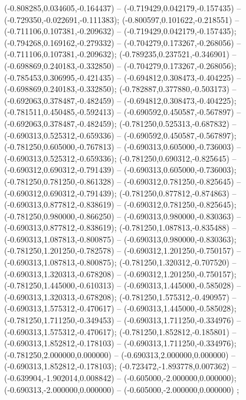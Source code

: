  (-0.808285,0.034605,-0.164437) -- (-0.719429,0.042179,-0.157435) -- (-0.729350,-0.022691,-0.111383);
 (-0.800597,0.101622,-0.218551) -- (-0.711106,0.107381,-0.209632) -- (-0.719429,0.042179,-0.157435);
 (-0.794268,0.169162,-0.279332) -- (-0.704279,0.173267,-0.268056) -- (-0.711106,0.107381,-0.209632);
 (-0.789235,0.237521,-0.346901) -- (-0.698869,0.240183,-0.332850) -- (-0.704279,0.173267,-0.268056);
 (-0.785453,0.306995,-0.421435) -- (-0.694812,0.308473,-0.404225) -- (-0.698869,0.240183,-0.332850);
 (-0.782887,0.377880,-0.503173) -- (-0.692063,0.378487,-0.482459) -- (-0.694812,0.308473,-0.404225);
 (-0.781511,0.450485,-0.592413) -- (-0.690592,0.450587,-0.567897) -- (-0.692063,0.378487,-0.482459);
 (-0.781250,0.525313,-0.687832) -- (-0.690313,0.525312,-0.659336) -- (-0.690592,0.450587,-0.567897);
 (-0.781250,0.605000,-0.767813) -- (-0.690313,0.605000,-0.736003) -- (-0.690313,0.525312,-0.659336);
 (-0.781250,0.690312,-0.825645) -- (-0.690312,0.690312,-0.791439) -- (-0.690313,0.605000,-0.736003);
 (-0.781250,0.781250,-0.861328) -- (-0.690312,0.781250,-0.825645) -- (-0.690312,0.690312,-0.791439);
 (-0.781250,0.877812,-0.874863) -- (-0.690313,0.877812,-0.838619) -- (-0.690312,0.781250,-0.825645);
 (-0.781250,0.980000,-0.866250) -- (-0.690313,0.980000,-0.830363) -- (-0.690313,0.877812,-0.838619);
 (-0.781250,1.087813,-0.835488) -- (-0.690313,1.087813,-0.800875) -- (-0.690313,0.980000,-0.830363);
 (-0.781250,1.201250,-0.782578) -- (-0.690312,1.201250,-0.750157) -- (-0.690313,1.087813,-0.800875);
 (-0.781250,1.320312,-0.707520) -- (-0.690313,1.320313,-0.678208) -- (-0.690312,1.201250,-0.750157);
 (-0.781250,1.445000,-0.610313) -- (-0.690313,1.445000,-0.585028) -- (-0.690313,1.320313,-0.678208);
 (-0.781250,1.575312,-0.490957) -- (-0.690313,1.575312,-0.470617) -- (-0.690313,1.445000,-0.585028);
 (-0.781250,1.711250,-0.349453) -- (-0.690313,1.711250,-0.334976) -- (-0.690313,1.575312,-0.470617);
 (-0.781250,1.852812,-0.185801) -- (-0.690313,1.852812,-0.178103) -- (-0.690313,1.711250,-0.334976);
 (-0.781250,2.000000,0.000000) -- (-0.690313,2.000000,0.000000) -- (-0.690313,1.852812,-0.178103);
 (-0.723472,-1.893778,0.007362) -- (-0.639904,-1.902014,0.008842) -- (-0.605000,-2.000000,0.000000);
 (-0.690313,-2.000000,0.000000) -- (-0.605000,-2.000000,0.000000) ;
